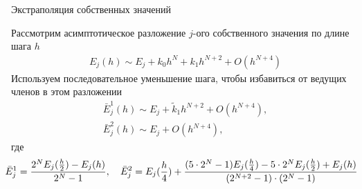 \documentclass[10pt,pdf,hyperref={unicode},xcolor=dvipsnames]{beamer}
\begin{document}
\begin{frame}{Экстраполяция собственных значений} 
    \begin{block}{}
        \vspace*{-1cm}
        Рассмотрим асимптотическое разложение $j$-ого собственного значения по длине шага $h$  
        \begin{gather}
            E_j(h) \sim E_j + k_0 h^N + k_1 h^{N+2} + O(h^{N+4})
        \end{gather}
        Используем последовательное уменьшение шага, чтобы избавиться от ведущих членов в этом разложении
        \begin{gather}
            \bar{E}_j^1(h) \sim E_j + \tilde{k}_1 h^{N+2} + O(h^{N+4}), \\
            \bar{E}_j^2(h) \sim E_j + O(h^{N+4}),
        \end{gather}
        где
        \begin{gather}
            \hspace*{-0.3cm}
            \bar{E}_j^1 = \frac{2^N E_j(\frac{h}{2}) - E_j(h)}{2^N - 1}, \quad 
            \bar{E}_j^2 = E_j(\frac{h}{4}) + \frac{(5 \cdot 2^N - 1) E_j(\frac{h}{4}) - 5\cdot 2^N E_j(\frac{h}{2}) + E_j(h)}{(2^{N+2} - 1) \cdot (2^N - 1)} \notag
        \end{gather}
    \end{block}
\end{frame}
\end{document}
